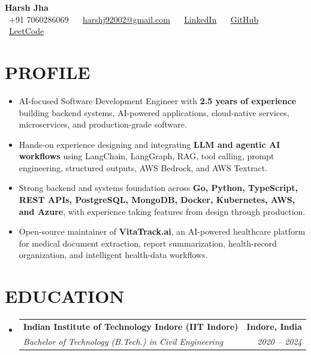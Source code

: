 \documentclass[letterpaper,11pt]{article}
\makeatletter
\newcommand{\resumeItem}[1]{
  \item[\textbullet]\small{
    {#1 \vspace{-2pt}}
  }
}
\newcommand{\resumeSubheading}[4]{
  \vspace{-4pt}\item
    \begin{tabular*}{1.0\textwidth}[t]{l@{\extracolsep{\fill}}r}
      \textbf{#1} & \textbf{#2} \\
      \textit{#3} & \textit{#4} \\
    \end{tabular*}\vspace{-6pt}
}
\newcommand{\resumeSubHeadingListStart}{
  \begin{itemize}[leftmargin=0in, label={}]
}
\newcommand{\resumeSubHeadingListEnd}{
  \end{itemize}
}
\newcommand{\resumeItemListStart}{
  \begin{itemize}[leftmargin=0.15in]
}
\newcommand{\resumeItemListEnd}{
  \end{itemize}\vspace{-6pt}
}
\makeatother
\begin{document}
\begin{center}
    {\huge \textbf{Harsh Jha}} \\ \vspace{6pt}
    {\faPhone \ +91 7060286069} ~
    {\faEnvelope \ \href{mailto:harshptct@gmail.com}{harshj92002@gmail.com}} ~
    {\faLinkedin \ \href{https://www.linkedin.com/in/harshjha-iiti/}{LinkedIn}} ~
    {\faGithub \ \href{https://github.com/jhaharsh03}{GitHub}} ~
    {\faCode \ \href{https://leetcode.com/u/harshdotcom/}{LeetCode}}
\end{center}


\section{\color{airforceblue}PROFILE}
\resumeItemListStart

\resumeItem{AI-focused Software Development Engineer with \textbf{2.5 years of experience} building backend systems, AI-powered applications, cloud-native services, microservices, and production-grade software.}

\resumeItem{Hands-on experience designing and integrating \textbf{LLM and agentic AI workflows} using LangChain, LangGraph, RAG, tool calling, prompt engineering, structured outputs, AWS Bedrock, and AWS Textract.}

\resumeItem{Strong backend and systems foundation across \textbf{Go, Python, TypeScript, REST APIs, PostgreSQL, MongoDB, Docker, Kubernetes, AWS, and Azure}, with experience taking features from design through production.}

\resumeItem{Open-source maintainer of \textbf{VitaTrack.ai}, an AI-powered healthcare platform for medical document extraction, report summarization, health-record organization, and intelligent health-data workflows.}

\resumeItemListEnd


\section{\color{airforceblue}EDUCATION}
\resumeSubHeadingListStart

\resumeSubheading
{Indian Institute of Technology Indore (IIT Indore)}{Indore, India}
{Bachelor of Technology (B.Tech.) in Civil Engineering}{2020 -- 2024}

\resumeSubHeadingListEnd


\end{document}
